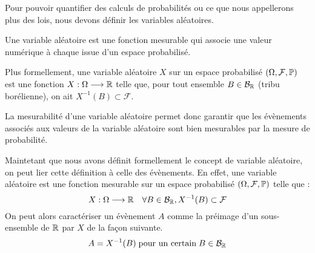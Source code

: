 Pour pouvoir quantifier des calculs de probabilités ou ce que nous appellerons plus des lois, nous devons définir 
les variables aléatoires. 

\begin{definition}
    Une variable aléatoire est une fonction mesurable qui associe une valeur numérique à chaque issue d'un espace probabilisé. 

    \vspace{0.5cm}

    Plus formellement, une variable aléatoire $X$ sur un espace probabilisé $(\Omega, \mathcal{F}, \mathbb{P})$ 
    est une fonction $ X : \Omega \longrightarrow \mathbb{R}$ telle que, pour tout ensemble $B \in \mathcal{B}_{\mathbb{R}}$ (tribu borélienne), 
    on ait $X^{-1} (B) \subset \mathcal{F}$. 
\end{definition}

La mesurabilité d'une variable aléatoire permet donc garantir que les évènements associés aux valeurs de la variable 
aléatoire sont bien mesurables par la mesure de probabilité. 

\begin{proposition}
    Maintetant que nous avons définit formellement le concept de variable aléatoire, on peut lier cette définition 
    à celle des évènements. En effet, une variable aléatoire est une fonction mesurable sur un espace probabilisé $(\Omega, \mathcal{F}, \mathbb{P})$
    telle que : 
        \[ X : \Omega \longrightarrow \mathbb{R} \quad \forall B \in \mathcal{B}_{\mathbb{R}}, X^{-1} (B) \subset \mathcal{F} \] 
    On peut alors caractériser un évènement $A$ comme la préimage d'un sous-ensemble de $\mathbb{R}$ par $X$ de la façon suivante. 
        \[ A = X^{-1}(B) \; \text{pour un certain} \; B \in \mathcal{B}_{\mathbb{R}} \] 
\end{proposition}









